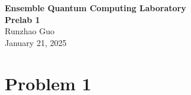 \documentclass[11pt]{article}
\newcommand{\courseName}{Ensemble Quantum Computing Laboratory}     %
\newcommand{\assignmentTitle}{Prelab 1} %
\newcommand{\studentName}{Runzhao Guo}       %
\newcommand{\Date}{January 21, 2025}   %
\begin{document}
\begin{center}
    {\large \textbf{\courseName}} \\
    \vspace{3pt}
    {\Large \textbf{\assignmentTitle}} \\
    \vspace{3pt}
    \studentName \\
    \vspace{3pt}
    \Date
\end{center}

\vspace{0.5in} %


\section*{Problem 1}
\end{document}
